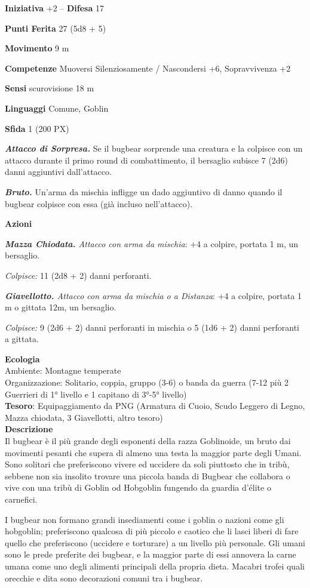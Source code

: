 \begin{multicols}{2}
\textbf{Iniziativa} +2 -- \textbf{Difesa} 17

\textbf{Punti Ferita} 27 (5d8 + 5)

\textbf{Movimento} 9 m

\textbf{Competenze} Muoversi Silenziosamente / Nascondersi +6, Sopravvivenza +2

\textbf{Sensi} scurovisione 18 m

\textbf{Linguaggi} Comune, Goblin

\textbf{Sfida} 1 (200 PX)

\textit{\textbf{Attacco di Sorpresa.}} Se il bugbear sorprende una creatura e la colpisce con un attacco durante il primo round di combattimento, il bersaglio subisce 7 (2d6) danni aggiuntivi
dall'attacco.

\textit{\textbf{Bruto.}} Un'arma da mischia infligge un dado aggiuntivo di danno quando il bugbear colpisce con essa (già incluso nell'attacco).

\textbf{Azioni}

\textit{\textbf{Mazza Chiodata.} Attacco con arma da mischia}: +4 a colpire, portata 1 m, un bersaglio.

\textit{Colpisce:} 11 (2d8 + 2) danni perforanti.

\textit{\textbf{Giavellotto.} Attacco con arma da mischia o a Distanza}: +4 a colpire, portata 1 m o gittata 12m, un bersaglio.

\textit{Colpisce:} 9 (2d6 + 2) danni perforanti in mischia o 5 (1d6 + 2) danni perforanti a gittata.

\textbf{Ecologia}\\
Ambiente: Montagne temperate\\
Organizzazione: Solitario, coppia, gruppo (3-6) o banda da guerra (7-12 più 2 Guerrieri di 1° livello e 1 capitano di 3°-5° livello)\\
\textbf{Tesoro}: Equipaggiamento da PNG (Armatura di Cuoio, Scudo Leggero di Legno, Mazza chiodata, 3 Giavellotti, altro tesoro)\\
\textbf{Descrizione}\\
Il bugbear è il più grande degli esponenti della razza Goblinoide, un bruto dai movimenti pesanti che supera di almeno una testa la maggior parte degli Umani. Sono solitari che preferiscono vivere ed uccidere da soli piuttosto che in tribù, sebbene non sia insolito trovare una piccola banda di Bugbear che collabora o vive con una tribù di Goblin od Hobgoblin fungendo da guardia d'élite o carnefici.

I bugbear non formano grandi insediamenti come i goblin o nazioni come gli hobgoblin; preferiscono qualcosa di più piccolo e caotico che li lasci liberi di fare quello che preferiscono (uccidere e torturare) a un livello più personale. Gli umani sono le prede preferite dei bugbear, e la maggior parte di essi annovera la carne umana come uno degli alimenti principali della propria dieta. Macabri trofei quali orecchie e dita sono decorazioni comuni tra i bugbear.


\end{multicols}
